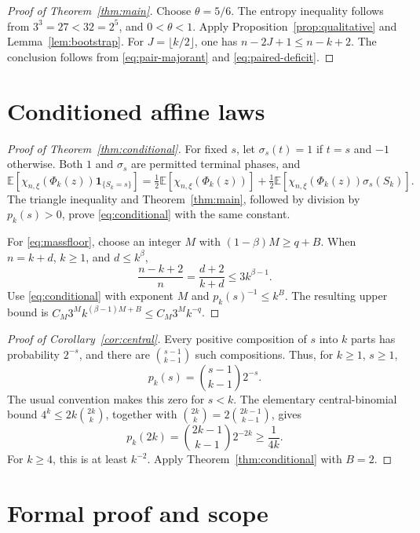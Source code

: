 \documentclass[11pt,a4paper]{article}
\newcommand{\E}{\mathbb E}
\begin{document}
\begin{proof}[Proof of Theorem~\ref{thm:main}]
Choose \(\theta=5/6\). The entropy inequality follows from
\(3^3=27<32=2^5\), and \(0<\theta<1\).
Apply Proposition~\ref{prop:qualitative} and Lemma~\ref{lem:bootstrap}.
For \(J=\lfloor k/2\rfloor\), one has
\(n-2J+1\le n-k+2\). The conclusion follows from
\eqref{eq:pair-majorant} and \eqref{eq:paired-deficit}.
\end{proof}

\section{Conditioned affine laws}\label{sec:conditioning}

\begin{proof}[Proof of Theorem~\ref{thm:conditional}]
For fixed \(s\), let \(\sigma_s(t)=1\) if \(t=s\) and \(-1\)
otherwise. Both \(1\) and \(\sigma_s\) are permitted terminal
phases, and
\[
 \E[\chi_{n,\xi}(\Phi_k(z))\mathbf1_{\{S_k=s\}}]
 =\tfrac12\E[\chi_{n,\xi}(\Phi_k(z))]
  +\tfrac12\E[\chi_{n,\xi}(\Phi_k(z))\sigma_s(S_k)].
\]
The triangle inequality and Theorem~\ref{thm:main}, followed by division
by \(p_k(s)>0\), prove \eqref{eq:conditional} with the same constant.

For \eqref{eq:massfloor}, choose an integer \(M\) with
\((1-\beta)M\ge q+B\). When \(n=k+d\), \(k\ge1\), and
\(d\le k^\beta\),
\[
 \frac{n-k+2}{n}=\frac{d+2}{k+d}
 \le 3k^{\beta-1}.
\]
Use \eqref{eq:conditional} with exponent \(M\) and
\(p_k(s)^{-1}\le k^B\). The resulting upper bound is
\(C_M3^M k^{(\beta-1)M+B}\le C_M3^Mk^{-q}\).
\end{proof}

\begin{proof}[Proof of Corollary~\ref{cor:central}]
Every positive composition of \(s\) into \(k\) parts has probability
\(2^{-s}\), and there are \(\binom{s-1}{k-1}\) such compositions.
Thus, for \(k\ge1\), \(s\ge1\),
\[
 p_k(s)=\binom{s-1}{k-1}2^{-s}.
\]
The usual convention makes this zero for \(s<k\).
The elementary central-binomial bound
\(4^k\le2k\binom{2k}{k}\), together with
\(\binom{2k}{k}=2\binom{2k-1}{k-1}\), gives
\[
 p_k(2k)=\binom{2k-1}{k-1}2^{-2k}\ge\frac1{4k}.
\]
For \(k\ge4\), this is at least \(k^{-2}\). Apply
Theorem~\ref{thm:conditional} with \(B=2\).
\end{proof}

\section{Formal proof and scope}\label{sec:formal}
\end{document}
